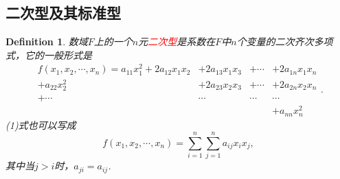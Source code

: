 \documentclass{article}
\newtheorem{definition}[theorem]{Definition}
\newcommand{\redt}[1]{\textcolor{red}{#1}}
\begin{document}
\subsection{二次型及其标准型}

\begin{definition}
\rm 数域$F$上的一个$n$元\redt{二次型}是系数在$F$中$n$个变量的二次齐次多项式，它的一般形式是
\begin{equation}
\begin{array}{rlll}
f(x_1,x_2,\cdots,x_n) = a_{11}x_1^2 + 2a_{12}x_1x_2 &+ 2a_{13}x_1x_3 &+ \cdots &+ 2a_{1n}x_1x_n \\
+a_{22}x_2^{2} &+ 2a_{23}x_2x_3 &+  \cdots &+2a_{2n}x_2x_n\\
+\cdots &\cdots &\cdots &\cdots  \\
&&&+a_{nn}x_n^2
\end{array}.
\end{equation}
(1)式也可以写成
\begin{equation}
f(x_1,x_2,\cdots,x_n) = \sum\limits_{i=1}^n\sum\limits_{j=1}^n a_{ij}x_ix_j,
\end{equation}
其中当$j>i$时，$a_{ji}=a_{ij}$.
\end{definition}
\end{document}
